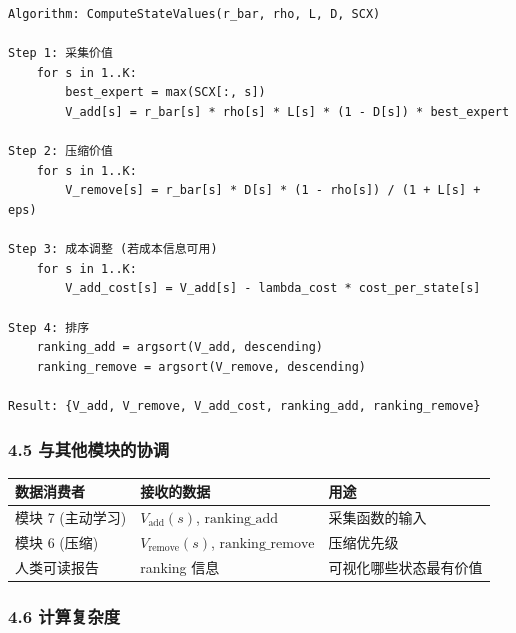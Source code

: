 \documentclass[
  12pt,
]{ctexart}
\begin{document}
\begin{verbatim}
Algorithm: ComputeStateValues(r_bar, rho, L, D, SCX)

Step 1: 采集价值
    for s in 1..K:
        best_expert = max(SCX[:, s])
        V_add[s] = r_bar[s] * rho[s] * L[s] * (1 - D[s]) * best_expert

Step 2: 压缩价值
    for s in 1..K:
        V_remove[s] = r_bar[s] * D[s] * (1 - rho[s]) / (1 + L[s] + eps)

Step 3: 成本调整 (若成本信息可用)
    for s in 1..K:
        V_add_cost[s] = V_add[s] - lambda_cost * cost_per_state[s]

Step 4: 排序
    ranking_add = argsort(V_add, descending)
    ranking_remove = argsort(V_remove, descending)

Result: {V_add, V_remove, V_add_cost, ranking_add, ranking_remove}
\end{verbatim}

\subsubsection{4.5
与其他模块的协调}\label{ux4e0eux5176ux4ed6ux6a21ux5757ux7684ux534fux8c03-3}

\begin{longtable}[]{@{}
  >{\raggedright\arraybackslash}p{}
  >{\raggedright\arraybackslash}p{}
  >{\raggedright\arraybackslash}p{}@{}}
\toprule\noalign{}
\begin{minipage}[b]{\linewidth}\raggedright
数据消费者
\end{minipage} & \begin{minipage}[b]{\linewidth}\raggedright
接收的数据
\end{minipage} & \begin{minipage}[b]{\linewidth}\raggedright
用途
\end{minipage} \\
\midrule\noalign{}
\endhead
\bottomrule\noalign{}
\endlastfoot
模块 7 (主动学习) & \(V_{\text{add}}(s)\), \(\text{ranking\_add}\) &
采集函数的输入 \\
模块 6 (压缩) & \(V_{\text{remove}}(s)\), \(\text{ranking\_remove}\) &
压缩优先级 \\
人类可读报告 & ranking 信息 & 可视化哪些状态最有价值 \\
\end{longtable}

\subsubsection{4.6 计算复杂度}\label{ux8ba1ux7b97ux590dux6742ux5ea6-3}
\end{document}
